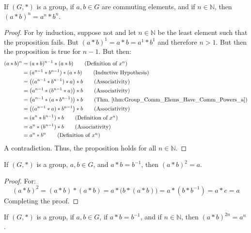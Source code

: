     \begin{theorem}
        If $(G,*)$ is a group, if $a,b\in{G}$ are commuting elements, and if
        $n\in\mathbb{N}$, then $(a*b)^{n}=a^{n}*b^{n}$.
    \end{theorem}
    \begin{proof}
        For by induction, suppose not and let $n\in\mathbb{N}$ be the least
        element such that the proposition fails. But $(a*b)^{1}=a*b=a^{1}*b^{1}$
        and therefore $n>1$. But then the proposition is true for $n-1$. But
        then:
        \begin{align}
            (a*b)^{n}&=(a*b)^{n-1}*(a*b)
            \tag{Definition of $x^{n}$}\\
            &=(a^{n-1}*b^{n-1})*(a*b)
            \tag{Inductive Hypothesis}\\
            &=\big((a^{n-1}*b^{n-1})*a\big)*b
            \tag{Associativity}\\
            &=\big(a^{n-1}*(b^{n-1}*a)\big)*b
            \tag{Associativity}\\
            &=\big(a^{n-1}*(a*b^{n-1})\big)*b
            \tag{Thm.~\ref{thm:Group_Comm_Elems_Have_Comm_Powers_a}}\\
            &=\big((a^{n-1}*a)*b^{n-1}\big)*b
            \tag{Associativity}\\
            &=(a^{n}*b^{n-1})*b
            \tag{Definition of $x^{n}$}\\
            &=a^{n}*(b^{n-1})*b
            \tag{Associativity}\\
            &=a^{n}*b^{n}
            \tag{Definition of $x^{n}$}
        \end{align}
        A contradiction. Thus, the proposition holds for all $n\in\mathbb{N}$.
    \end{proof}
    \begin{theorem}
        \label{thm:Group_bab_eq_e_implies_abab_eq_a}%
        If $(G,*)$ is a group, $a,b\in{G}$, and $a*b=b^{\minus{1}}$, then
        $(a*b)^{2}=a$.
    \end{theorem}
    \begin{proof}
        For:
        \begin{equation}
            (a*b)^{2}=(a*b)*(a*b)
                =a*\big(b*(a*b)\big)
                =a*(b*b^{\minus{1}})
                =a*e
                =a
        \end{equation}
        Completing the proof.
    \end{proof}
    \begin{theorem}
        If $(G,*)$ is a group, if $a,b\in{G}$, if $a*b=b^{\minus{1}}$, and if
        $n\in\mathbb{N}$, then $(a*b)^{2n}=a^{n}$.
    \end{theorem}
